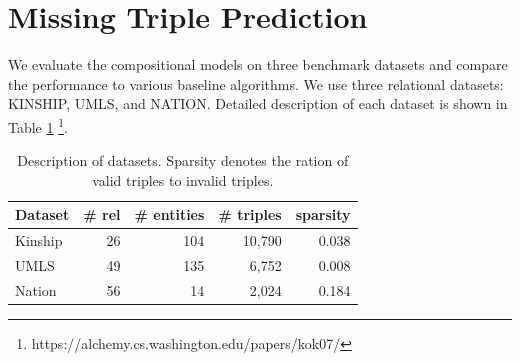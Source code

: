 \section{Missing Triple Prediction}
\label{sec:exp1}
We evaluate the compositional models on three benchmark datasets and compare the performance to various baseline 
algorithms. We use three relational datasets: KINSHIP, UMLS, and NATION. Detailed description of each 
dataset is shown in Table \ref{tbl:dataset} \footnote{https://alchemy.cs.washington.edu/papers/kok07/}.

\begin{table}[t]
\centering
\caption{\label{tbl:dataset}Description of datasets. 
Sparsity denotes the ration of valid triples to invalid triples.}
\vskip 0.15in
\begin{tabular}{l | r | r | r | r}
Dataset &  \# rel & \# entities & \# triples & sparsity \\ \hline
Kinship & 26 & 104  & 10,790 & 0.038 \\
UMLS & 49 &135  & 6,752 & 0.008 \\
Nation & 56 & 14  & 2,024 & 0.184 \\
\end{tabular}
\end{table}


